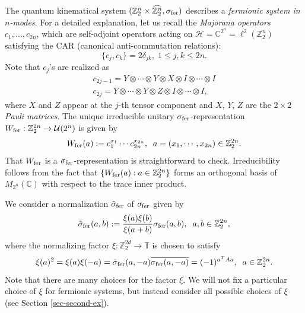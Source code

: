 \documentclass[12pt,reqno]{amsart}
\theoremstyle{definition}
\theoremstyle{definition}
\theoremstyle{definition}
\numberwithin{thm}{section}
\numberwithin{equation}{section}
\newcommand{\Comp}{\mathbb{C}}
\newcommand{\Hi}{\mathcal{H}}
\newcommand{\tor}{\mathbb{T}}
\newcommand{\z}{\mathbb{Z}}
\newcommand{\mc}[1]{\mathcal #1}
\begin{document}
The quantum kinematical system $(\z_2^n\times \widehat{\z_2^n}, \sigma_{\rm fer})$ describes a {\it fermionic system in $n$-modes}. For a detailed explanation, let us recall the {\em Majorana operators} $c_1 , \dots, c_{2n}$, which are self-adjoint operators acting on $\Hi = \Comp^{2^n}= \ell^2(\z^n_2)$ satisfying the CAR (canonical anti-commutation relations): 
    $$\{c_j, c_k\} = 2\delta_{jk},\; 1\le j,k\le 2n.$$
Note that $c_j$'s are realized as
\begin{align*}
    c_{2j-1}=Y\otimes\cdots\otimes Y\otimes X\otimes I\otimes \cdots \otimes I\\
    c_{2j}=Y\otimes\cdots\otimes Y\otimes Z\otimes I\otimes \cdots \otimes I,
\end{align*}
where $X$ and $Z$ appear at the $j$-th tensor component and $X$, $Y$, $Z$ are the $2\times 2$ \textit{Pauli matrices}.
The unique irreducible unitary $\sigma_{\rm fer}$-representation $W_{\rm fer}:\z^{2n}_2 \to \mc{U}(2^n)$ is given by
    \begin{equation}\label{eq-W-eps}
    W_{\rm fer}( a ) := c^{x_1}_1 \cdots c^{x_{2n}}_{2n},\;\;  a  = (x_1,\cdots,x_{2n}) \in \z^{2n}_2.    
    \end{equation}
That $W_{\rm fer}$ is a $\sigma_{\rm fer}$-representation is straightforward to check. Irreducibility follows from the fact that $\{W_{\rm fer}( a ):  a  \in \z^{2n}_2\}$ forms an orthogonal basis of $M_{2^n}(\Comp)$ with respect to the trace inner product. 

We  consider a normalization $\tilde{\sigma}_{\rm fer}$ of $\sigma_{\rm fer}$ given by
    \begin{equation}\label{eq-normalization-fermi}
        \tilde{\sigma}_{\rm fer}( a , b ):=\frac{\xi( a )\xi( b )}{\xi( a + b )}\sigma_{\rm fer}( a , b ),\;\; a,b \in \z^{2n}_2,
    \end{equation}
where the normalizing factor $\xi:\z_2^{2d}\to \tor$ is chosen to satisfy
    $$\xi( a )^2=\xi(a)\xi(-a)=\tilde{\sigma}_{\rm fer}( a ,- a )\overline{\sigma_{\rm fer}( a ,- a )}=(-1)^{ a ^T A a },\;\; a\in \z^{2n}_2.$$
Note that there are many choices for the factor $\xi$. We will not fix a particular choice of $\xi$ for fermionic systems, but instead consider all possible choices of $\xi$ (see Section \ref{sec-second-ex}).
\end{document}
